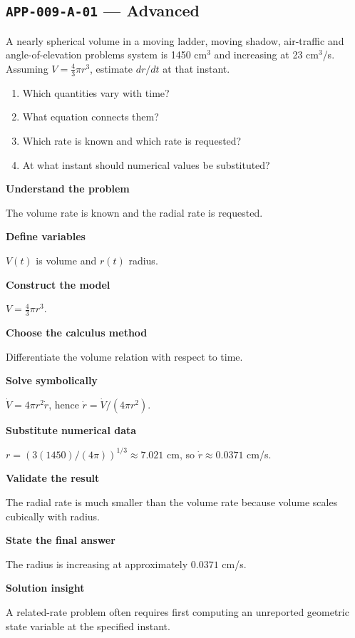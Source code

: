 \documentclass[11pt]{book}
\newcommand{\pid}[1]{\texttt{#1}}
\begin{document}
\subsection*{\pid{APP-009-A-01} — Advanced}
\begin{problembox}
A nearly spherical volume in a moving ladder, moving shadow, air-traffic and angle-of-elevation problems system is 1450 cm$^3$ and increasing at 23 cm$^3$/s. Assuming $V=\frac43\pi r^3$, estimate $dr/dt$ at that instant.
\end{problembox}
\begin{promptbox}\begin{enumerate}
\item Which quantities vary with time?
\item What equation connects them?
\item Which rate is known and which rate is requested?
\item At what instant should numerical values be substituted?
\end{enumerate}\end{promptbox}
\begin{solutionbox}
\textbf{Understand the problem}\par The volume rate is known and the radial rate is requested.\par\medskip
\textbf{Define variables}\par $V(t)$ is volume and $r(t)$ radius.\par\medskip
\textbf{Construct the model}\par $V=\frac43\pi r^3$.\par\medskip
\textbf{Choose the calculus method}\par Differentiate the volume relation with respect to time.\par\medskip
\textbf{Solve symbolically}\par $\dot V=4\pi r^2\dot r$, hence $\dot r=\dot V/(4\pi r^2)$.\par\medskip
\textbf{Substitute numerical data}\par $r=(3(1450)/(4\pi))^{1/3}\approx 7.021$ cm, so $\dot r\approx 0.0371$ cm/s.\par\medskip
\textbf{Validate the result}\par The radial rate is much smaller than the volume rate because volume scales cubically with radius.\par\medskip
\textbf{State the final answer}\par The radius is increasing at approximately $0.0371$ cm/s.\par\medskip
\textbf{Solution insight}\par A related-rate problem often requires first computing an unreported geometric state variable at the specified instant.\par\medskip
\end{solutionbox}
\end{document}
